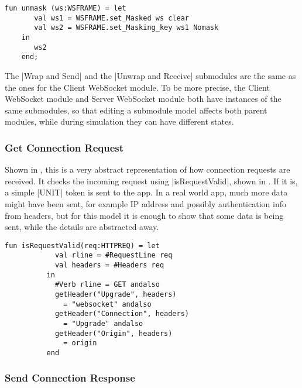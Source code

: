 	\begin{lstlisting}[label=lst:unmask,caption=unmask,gobble=1,float]
	fun unmask (ws:WSFRAME) = let
	   val ws1 = WSFRAME.set_Masked ws clear
	   val ws2 = WSFRAME.set_Masking_key ws1 Nomask
	in 
	   ws2
	end;
	\end{lstlisting}
		
	The |Wrap and Send| and the
	|Unwrap and Receive| submodules are the same as the ones for the
	Client WebSocket module. To be more precise, the Client WebSocket module and Server
	WebSocket module both have instances of the same submodules, so that editing
	a submodule model affects both parent modules, while during simulation they
	can have different states.
	
	\subsubsection{Get Connection Request}
		
		
		Shown in , this is a very abstract representation of how
		connection requests are received. It checks the incoming request using
		|isRequestValid|, shown in . If it is, a
		simple |UNIT| token is sent to the app. In a real world app, much more data
		might have been sent, for example IP address and possibly authentication info
		from headers, but for this model it is enough to show that some data is being
		sent, while the details are abstracted away.

		\begin{lstlisting}[label=lst:generateAccept,caption=generateAccept,gobble=2,float]
		 fun isRequestValid(req:HTTPREQ) = let
            val rline = #RequestLine req
            val headers = #Headers req
          in
            #Verb rline = GET andalso
            getHeader("Upgrade", headers) 
              = "websocket" andalso
            getHeader("Connection", headers) 
              = "Upgrade" andalso
            getHeader("Origin", headers) 
              = origin 
          end
		\end{lstlisting}
		
	\subsubsection{Send Connection Response}
		
		
